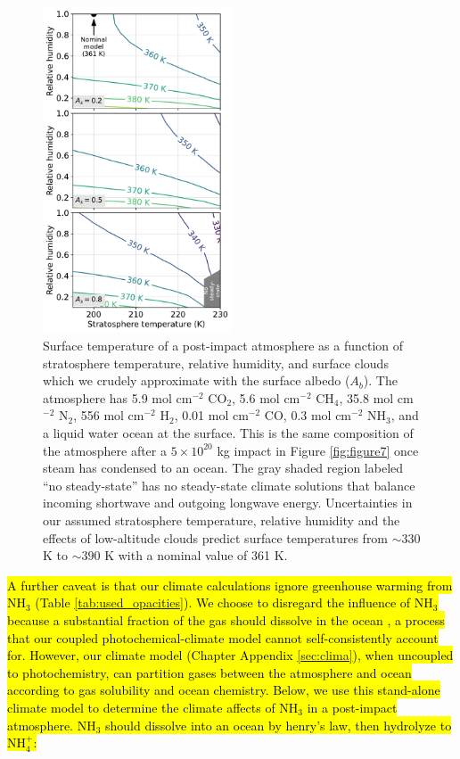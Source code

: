 \begin{figure}
  \centering
  \includegraphics[width=0.5\textwidth]{tex/5impacts/figures/Figure8.pdf}
  \caption{Surface temperature of a post-impact atmosphere as a function of stratosphere temperature, relative humidity, and surface clouds which we crudely approximate with the surface albedo ($A_b$). The atmosphere has 5.9 mol cm$^{-2}$ CO$_2$, 5.6 mol cm$^{-2}$ CH$_4$, 35.8 mol cm$^{-2}$ N$_2$, 556 mol cm$^{-2}$ H$_2$, 0.01 mol cm$^{-2}$ CO, 0.3 mol cm$^{-2}$ NH$_3$, and a liquid water ocean at the surface. This is the same composition of the atmosphere after a $5 \times 10^{20}$ kg impact in Figure \ref{fig:figure7} once steam has condensed to an ocean. The gray shaded region labeled ``no steady-state'' has no steady-state climate solutions that balance incoming shortwave and outgoing longwave energy. Uncertainties in our assumed stratosphere temperature, relative humidity and the effects of low-altitude clouds predict surface temperatures from $\sim 330$ K to $\sim 390$ K with a nominal value of 361 K.}
  \label{fig:figure8}
\end{figure}

\hl{A further caveat is that our climate calculations ignore greenhouse warming from NH$_3$ (Table \mbox{\ref{tab:used_opacities}}). We choose to disregard the influence of NH$_3$ because a substantial fraction of the gas should dissolve in the ocean \mbox{\citep{Zahnle_2020}}, a process that our coupled photochemical-climate model cannot self-consistently account for. However, our climate model (Chapter Appendix \mbox{\ref{sec:clima}}), when uncoupled to photochemistry, can partition gases between the atmosphere and ocean according to gas solubility and ocean chemistry. Below, we use this stand-alone climate model to determine the climate affects of NH$_3$ in a post-impact atmosphere. NH$_3$ should dissolve into an ocean by henry's law, then hydrolyze to NH$_4^+$:}

